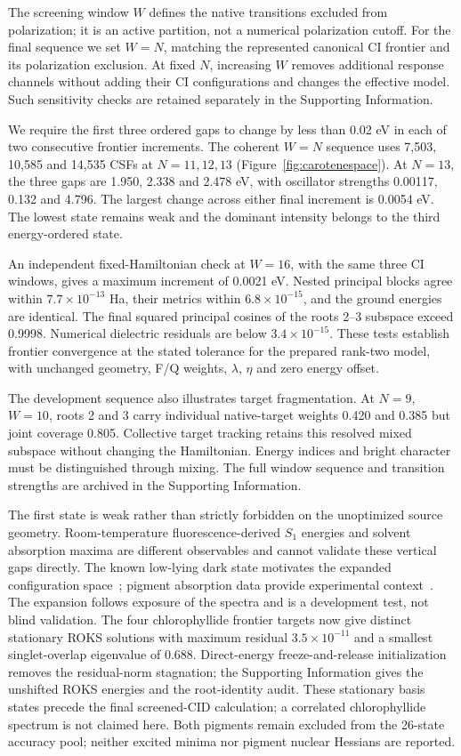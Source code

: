 The screening window $W$ defines the native transitions excluded from
polarization; it is an active partition, not a numerical polarization cutoff.
For the final sequence we set $W=N$, matching the represented canonical
CI frontier and its polarization exclusion. At fixed $N$, increasing $W$
removes additional response channels without adding their CI configurations
and changes the effective model. Such sensitivity checks are retained
separately in the Supporting Information.

We require the first three ordered gaps to change by less than 0.02 eV
in each of two consecutive frontier increments. The coherent $W=N$
sequence uses 7,503, 10,585 and 14,535 CSFs at $N=11,12,13$
(Figure~\ref{fig:carotenespace}). At $N=13$, the three gaps are
1.950, 2.338 and 2.478 eV, with oscillator strengths 0.00117,
0.132 and 4.796. The largest change across either final increment is
0.0054 eV. The lowest state remains weak and the dominant intensity
belongs to the third energy-ordered state.

An independent fixed-Hamiltonian check at $W=16$, with the same three
CI windows, gives a maximum increment of 0.0021 eV. Nested principal
blocks agree within $7.7\times10^{-13}$ Ha, their metrics within
$6.8\times10^{-15}$, and the ground energies are identical. The final
squared principal cosines of the roots 2--3 subspace exceed 0.9998.
Numerical dielectric residuals are below $3.4\times10^{-15}$.
These tests establish frontier convergence at the stated tolerance for
the prepared rank-two model, with unchanged geometry, F/Q weights,
$\lambda$, $\eta$ and zero energy offset.

The development sequence also illustrates target fragmentation. At
$N=9$, $W=10$, roots 2 and 3 carry individual native-target weights
0.420 and 0.385 but joint coverage 0.805. Collective target tracking
retains this resolved mixed subspace without changing the Hamiltonian.
Energy indices and bright character must be distinguished through mixing.
The full window sequence and transition strengths are archived in the
Supporting Information.

The first state is weak rather than strictly forbidden on the unoptimized
source geometry. Room-temperature fluorescence-derived $S_1$ energies
and solvent absorption maxima are different observables and cannot
validate these vertical gaps directly. The known low-lying dark state
motivates the expanded configuration space~\cite{Bondarev1994}; pigment
absorption data provide experimental context~\cite{Clementson2019}.
The expansion follows exposure of the spectra and is a development test,
not blind validation. The four chlorophyllide frontier targets now give distinct stationary
ROKS solutions with maximum residual $3.5\times10^{-11}$ and a smallest
singlet-overlap eigenvalue of 0.688. Direct-energy freeze-and-release
initialization removes the residual-norm stagnation; the Supporting
Information gives the unshifted ROKS energies and the root-identity audit.
These stationary basis states precede the final screened-CID calculation;
a correlated chlorophyllide spectrum is not claimed here.
Both pigments remain excluded from the 26-state accuracy pool; neither
excited minima nor pigment nuclear Hessians are reported.

